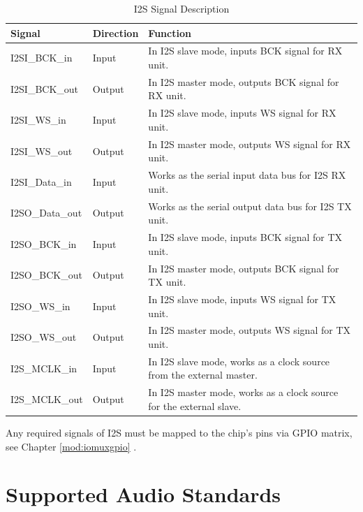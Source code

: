\documentclass[main\_\_EN.tex]{subfiles}
\begin{document}
\begin{table}[H]
    \centering
    \caption{I2S Signal Description}
    \label{tab:i2s-signal-descr}
    \begin{tabular}{|p{2.8cm}|p{1.8cm}|p{10.2cm}| }
    \hline
    \rowcolor{lightgray}
    \textbf{Signal} & \textbf{Direction} & \textbf{Function} \\
    \hline
    I2SI\_BCK\_in  & Input & In I2S slave mode, inputs BCK signal for RX unit. \\
    \hline
    I2SI\_BCK\_out& Output & In I2S master mode, outputs BCK signal for RX unit. \\
    \hline
    I2SI\_WS\_in & Input & In I2S slave mode, inputs WS signal for RX unit. \\
    \hline
    I2SI\_WS\_out& Output & In I2S master mode, outputs WS signal for RX unit. \\\hline
    I2SI\_Data\_in& Input & Works as the serial input data bus for I2S RX unit.\\\hline
    I2SO\_Data\_out& Output & Works as the serial output data bus for I2S TX unit.\\\hline
    
    I2SO\_BCK\_in&  Input & In I2S slave mode, inputs BCK signal for TX unit. \\\hline
    I2SO\_BCK\_out&  Output & In I2S master mode, outputs BCK signal for TX unit. \\\hline
    I2SO\_WS\_in&  Input & In I2S slave mode, inputs WS signal for TX unit. \\\hline
    I2SO\_WS\_out& Output & In I2S master mode, outputs WS signal for TX unit. \\\hline
    I2S\_MCLK\_in& Input & In I2S slave mode, works as a clock source from the external master.\\\hline
    I2S\_MCLK\_out& Output & In I2S master mode, works as a clock source for the external slave. \\\hline
    \end{tabular}
\end{table}

\vspace{-0.5em}
\begin{tiplisting}
Any required signals of I2S must be mapped to the chip's pins via GPIO matrix, see Chapter \ref{mod:iomuxgpio} \textit{}.
\end{tiplisting}

\section{Supported Audio Standards} \label{sec:i2s-supported-audio-standards}
\end{document}
